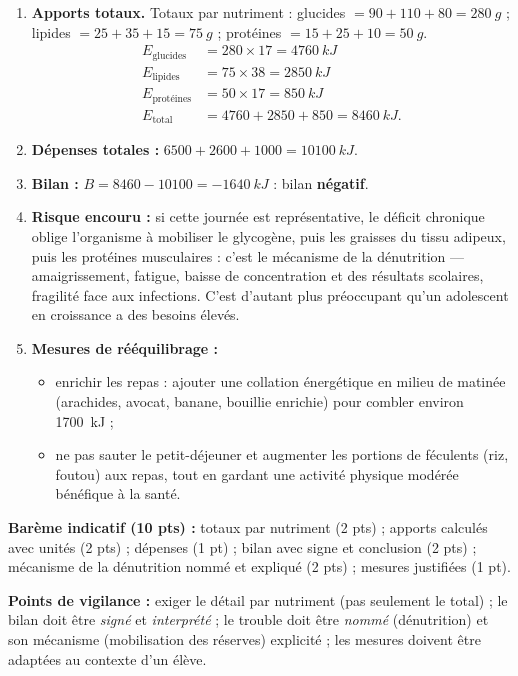 \documentclass[11pt]{article}
\newcommand{\cle}[1]{{\popxbold\color{popdark}#1}}
\begin{document}
\begin{corrige}
\tcblower
\begin{enumerate}
\item \textbf{Apports totaux.} Totaux par nutriment : glucides $= 90 + 110 + 80 = \SI{280}{g}$ ; lipides $= 25 + 35 + 15 = \SI{75}{g}$ ; protéines $= 15 + 25 + 10 = \SI{50}{g}$.
\begin{align*}
E_{\text{glucides}} &= 280 \times 17 = \SI{4760}{kJ}\\
E_{\text{lipides}} &= 75 \times 38 = \SI{2850}{kJ}\\
E_{\text{protéines}} &= 50 \times 17 = \SI{850}{kJ}\\
E_{\text{total}} &= 4760 + 2850 + 850 = \SI{8460}{kJ}.
\end{align*}
\item \textbf{Dépenses totales :} $6500 + 2600 + 1000 = \SI{10100}{kJ}$.
\item \textbf{Bilan :} $B = 8460 - 10100 = -\SI{1640}{kJ}$ : bilan \textbf{négatif}.
\item \textbf{Risque encouru :} si cette journée est représentative, le déficit chronique oblige l'organisme à mobiliser le glycogène, puis les graisses du tissu adipeux, puis les protéines musculaires : c'est le mécanisme de la \cle{dénutrition} — amaigrissement, fatigue, baisse de concentration et des résultats scolaires, fragilité face aux infections. C'est d'autant plus préoccupant qu'un adolescent en croissance a des besoins élevés.
\item \textbf{Mesures de rééquilibrage :}
\begin{itemize}
\item enrichir les repas : ajouter une collation énergétique en milieu de matinée (arachides, avocat, banane, bouillie enrichie) pour combler environ \SI{1700}{kJ} ;
\item ne pas sauter le petit-déjeuner et augmenter les portions de féculents (riz, foutou) aux repas, tout en gardant une activité physique modérée bénéfique à la santé.
\end{itemize}
\end{enumerate}
\textbf{Barème indicatif (10 pts) :} totaux par nutriment (2 pts) ; apports calculés avec unités (2 pts) ; dépenses (1 pt) ; bilan avec signe et conclusion (2 pts) ; mécanisme de la dénutrition nommé et expliqué (2 pts) ; mesures justifiées (1 pt).

\textbf{Points de vigilance :} exiger le détail par nutriment (pas seulement le total) ; le bilan doit être \emph{signé} et \emph{interprété} ; le trouble doit être \emph{nommé} (dénutrition) et son mécanisme (mobilisation des réserves) explicité ; les mesures doivent être adaptées au contexte d'un élève.
\end{corrige}
\end{document}
